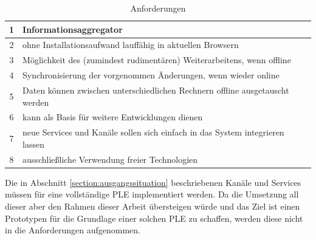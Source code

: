 \begin{table}[h]
\caption{Anforderungen}
\begin{tabular}{c || l}
1 & Informationsaggregator \\
\hline
2 & ohne Installationsaufwand lauffähig in aktuellen Browsern \\
\hline
3 & Möglichkeit des (zumindest rudimentären) Weiterarbeitens, wenn offline \\
\hline
4 & Synchronisierung der vorgenommen Änderungen, wenn wieder online \\
\hline
5 & Daten können zwischen unterschiedlichen Rechnern offline ausgetauscht werden \\
\hline
6 & kann als Basis für weitere Entwicklungen dienen\\
\hline
7 & neue Services und Kanäle sollen sich einfach in das System integrieren lassen  \\
\hline
8 & ausschließliche Verwendung freier Technologien \\
\hline
\end{tabular}
\label{table:anforderungen}
\end{table}

Die in Abschnitt \ref{section:ausgangssituation} beschriebenen Kanäle und Services müssen für eine vollständige PLE implementiert werden. Da die Umsetzung all dieser aber den Rahmen dieser Arbeit übersteigen würde und das Ziel ist einen Prototypen für die Grundlage einer solchen PLE zu schaffen, werden diese nicht in die Anforderungen aufgenommen.